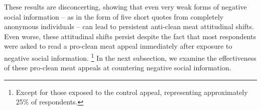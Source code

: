 \documentclass[12pt]{article}
\newcommand{\figurepath}[1]{../output/figures/#1}
\begin{document}
These results are disconcerting, showing that even very weak forms of negative social information -- as in the form of five short quotes from completely anonymous individuals -- can lead to persistent anti-clean meat attitudinal shifts. Even worse, these attitudinal shifts persist despite the fact that most respondents were asked to read a pro-clean meat appeal immediately after exposure to negative social information.
\footnote{Except for those exposed to the control appeal, representing approximately 25\% of respondents.}
In the next subsection, we examine the effectiveness of these pro-clean meat appeals at countering negative social information.




\end{document}
